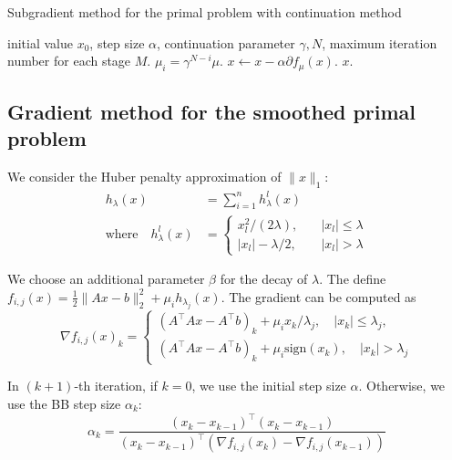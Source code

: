 \documentclass{article}
\numberwithin{equation}{section}
\numberwithin{figure}{section}
\begin{document}
\begin{algorithm}[!htbp]\caption{Subgradient method for the primal problem with continuation method}\label{alg:subgrad}
\begin{algorithmic}[1]
 initial value $x_0$, step size $\alpha$, continuation parameter $\gamma,N$, maximum iteration number for each stage $M$.
\STATE $\mu_i = \gamma^{N-i}\mu$.
\STATE $x\leftarrow x - \alpha \partial f_\mu(x)$.
\ENDFOR
\ENDFOR
{} $x$.
\end{algorithmic}
\end{algorithm}

\subsection{Gradient method for the smoothed primal problem}
We consider the Huber penalty approximation of $\|x\|_1$:
\begin{equation}
\begin{split}
        h_\lambda(x) &= \sum_{i=1}^n h_\lambda^l(x)\\
        \mathrm{where}\quad h_\lambda^l(x)&=\begin{cases}
        x_l^2/(2\lambda),\quad & |x_l|\leq\lambda\\
        |x_l|-\lambda/2,\quad & |x_l|>\lambda
        \end{cases}
\end{split}
\end{equation}

We choose an additional parameter $\beta$ for the decay of $\lambda$. The define $f_{i,j}(x)=\frac{1}{2}\|Ax-b\|_2^2+\mu_i h_{\lambda_j}(x)$. The gradient can be computed as
\begin{equation}
    \nabla f_{i,j}(x)_k = \begin{cases}
    (A^\top Ax-A^\top b)_k +\mu_ix_k/\lambda_j,\quad |x_k|\leq \lambda_j,\\
    (A^\top Ax-A^\top b)_k +\mu_i\mathrm{sign}(x_k),\quad |x_k|> \lambda_j
    \end{cases}
\end{equation}

In $(k+1)$-th iteration, if $k=0$, we use the initial step size $\alpha$. Otherwise, we use the BB step size $\alpha_k$:
\begin{equation}
    \alpha_k = \frac{(x_k-x_{k-1})^\top (x_k-x_{k-1})}{(x_k-x_{k-1})^\top(\nabla f_{i,j}(x_k)-\nabla f_{i,j}(x_{k-1}))} \label{eq:bb1}
\end{equation}
\end{document}
